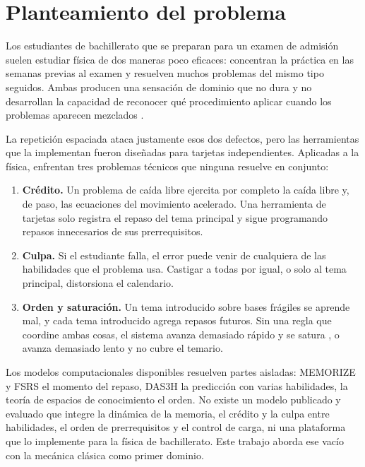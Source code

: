 \documentclass[12pt]{article}
\theoremstyle{definition}
\begin{document}
\section{Planteamiento del problema}
\label{sec:problema}

Los estudiantes de bachillerato que se preparan para un examen de admisión suelen estudiar física de dos maneras poco eficaces: concentran la práctica en las semanas previas al examen y resuelven muchos problemas del mismo tipo seguidos. Ambas producen una sensación de dominio que no dura y no desarrollan la capacidad de reconocer qué procedimiento aplicar cuando los problemas aparecen mezclados \citep{kang2016,yuan2022}.

La repetición espaciada ataca justamente esos dos defectos, pero las herramientas que la implementan fueron diseñadas para tarjetas independientes. Aplicadas a la física, enfrentan tres problemas técnicos que ninguna resuelve en conjunto:

\begin{enumerate}
\item \textbf{Crédito.} Un problema de caída libre ejercita por completo la caída libre y, de paso, las ecuaciones del movimiento acelerado. Una herramienta de tarjetas solo registra el repaso del tema principal y sigue programando repasos innecesarios de sus prerrequisitos.
\item \textbf{Culpa.} Si el estudiante falla, el error puede venir de cualquiera de las habilidades que el problema usa. Castigar a todas por igual, o solo al tema principal, distorsiona el calendario.
\item \textbf{Orden y saturación.} Un tema introducido sobre bases frágiles se aprende mal, y cada tema introducido agrega repasos futuros. Sin una regla que coordine ambas cosas, el sistema avanza demasiado rápido y se satura \citep{reddy2016}, o avanza demasiado lento y no cubre el temario.
\end{enumerate}

Los modelos computacionales disponibles resuelven partes aisladas: MEMORIZE y FSRS el momento del repaso, DAS3H la predicción con varias habilidades, la teoría de espacios de conocimiento el orden. No existe un modelo publicado y evaluado que integre la dinámica de la memoria, el crédito y la culpa entre habilidades, el orden de prerrequisitos y el control de carga, ni una plataforma que lo implemente para la física de bachillerato. Este trabajo aborda ese vacío con la mecánica clásica como primer dominio.
\end{document}
